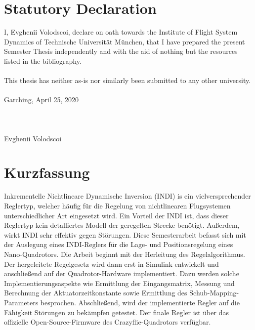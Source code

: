 \documentclass[11pt, a4paper, twoside]{report}
\begin{document}



\newpage\null\thispagestyle{empty}\newpage


\vspace*{-0.8cm}
\section*{Statutory Declaration}
I, Evghenii Volodscoi, declare on oath towards the Institute of Flight System Dynamics of Technische Universität München, that I have prepared the present Semester Thesis independently and with the aid of nothing but the resources listed in the bibliography.
\\
\\
This thesis has neither as-is nor similarly been submitted to any other university.
\bigskip
\\
\\
Garching, April 25, 2020
\\
\\
\\
\\
Evghenii Volodscoi

\thispagestyle{fancy_beginning}
\renewcommand{\chaptermark}[1]{\markboth{#1}{}}
\chaptermark{Statutory Declaration}

\newpage\null\thispagestyle{empty}\newpage

\section*{Kurzfassung} \label{sec:kurzfassung}
\begin{itshape}
Inkrementelle Nichtlineare Dynamische Inversion (INDI) is ein vielversprechender Reglertyp, welcher h\"aufig f\"ur die Regelung von nichtlinearen Flugsystemen unterschiedlicher Art eingesetzt wird. Ein Vorteil der INDI ist, dass dieser Reglertyp kein detalliertes Modell der geregelten Strecke ben\"otigt. Au\ss{}erdem, wirkt INDI sehr effektiv gegen St\"orungen. Diese Semesterarbeit befasst sich mit der Auslegung eines INDI-Reglers f\"ur die Lage- und Positionsregelung eines Nano-Quadrotors. Die Arbeit beginnt mit der Herleitung des Regelalgorithmus. Der hergeleitete Regelgesetz wird dann erst in Simulink entwickelt und anschlie\ss{}end auf der Quadrotor-Hardware implementiert. Dazu werden solche Implementierungsaspekte wie Ermittlung der Eingangsmatrix, Messung und Berechnung der Aktuatorzeitkonstante sowie Ermittlung des Schub-Mapping-Parameters besprochen. Abschlie\ss{}end, wird der implementierte Regler auf die F\"ahigkeit St\"orungen zu bek\"ampfen getestet. Der finale Regler ist \"uber das offizielle Open-Source-Firmware des Crazyflie-Quadrotors verf\"ugbar. 
\end{itshape}
\end{document}
